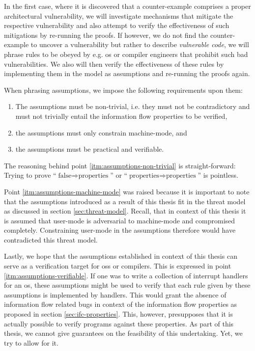 In the first case, where it is discovered that a counter-example comprises a proper architectural vulnerability, we will investigate mechanisms that mitigate the respective vulnerability and also attempt to verify the effectiveness of such mitigations by re-running the proofs.
If however, we do not find the counter-example to uncover a vulnerability but rather to describe \textit{vulnerable code}, we will phrase rules to be obeyed by e.g. \gls{os} or compiler engineers that prohibit such bad vulnerabilities.
We also will then verify the effectiveness of these rules by implementing them in the model as assumptions and re-running the proofs again.

When phrasing assumptions, we impose the following requirements upon them:
\begin{enumerate}
    \item \label{itm:assumptions-non-trivial}
    The assumptions must be non-trivial, i.e. they must not be contradictory and must not trivially entail the information flow properties to be verified,
    \item \label{itm:assumptions-machine-mode}
    the assumptions must only constrain machine-mode, and
    \item \label{itm:assumptions-verifiable}
    the assumptions must be practical and verifiable.
\end{enumerate}

The reasoning behind point \ref{itm:assumptions-non-trivial} is straight-forward:
Trying to prove \enquote{$ \text{false} \Rightarrow \text{properties} $} or \enquote{$ \text{properties} \Rightarrow \text{properties} $} is pointless.

Point \ref{itm:assumptions-machine-mode} was raised because it is important to note that the assumptions introduced as a result of this thesis fit in the threat model as discussed in section \ref{sec:threat-model}.
Recall, that in context of this thesis it is assumed that user-mode is adversarial to machine-mode and compromised completely.
Constraining user-mode in the assumptions therefore would have contradicted this threat model.

Lastly, we hope that the assumptions established in context of this thesis can serve as a verification target for \glspl{os} or compilers.
This is expressed in point \ref{itm:assumptions-verifiable}.
If one was to write a collection of interrupt handlers for an \gls{os}, these assumptions might be used to verify that each rule given by these assumptions is implemented by handlers.
This would grant the absence of information flow related bugs in context of the information flow properties as proposed in section \ref{sec:ifc-properties}.
This, however, presupposes that it is actually possible to verify programs against these properties.
As part of this thesis, we cannot give guarantees on the feasibility of this undertaking.
Yet, we try to allow for it.

